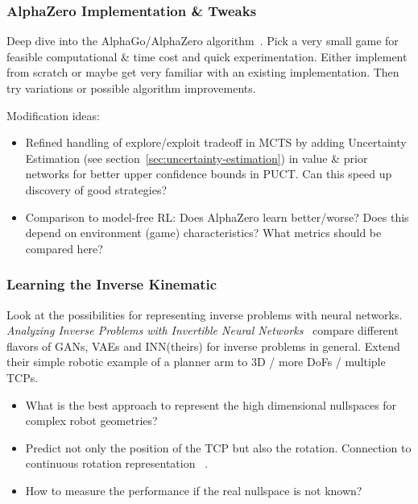 \documentclass[a4paper]{article}
\begin{document}
\subsubsection{AlphaZero Implementation \& Tweaks}
Deep dive into the AlphaGo/AlphaZero algorithm~\cite{Silver2016, Silver2017, Silver2017a}. Pick a very small game for feasible computational \& time cost and quick experimentation. Either implement from scratch or maybe get very familiar with an existing implementation. Then try variations or possible algorithm improvements.

Modification ideas:
\begin{itemize}
  \item Refined handling of explore/exploit tradeoff in MCTS by adding Uncertainty Estimation (see section~\ref{sec:uncertainty-estimation}) in value \& prior networks for better upper confidence bounds in PUCT. Can this speed up discovery of good strategies?
  \item Comparison to model-free RL: Does AlphaZero learn better/worse? Does this depend on environment (game) characteristics? What metrics should be compared here?
\end{itemize}

\subsubsection{Learning the Inverse Kinematic}
Look at the possibilities for representing inverse problems with neural networks.
\textit{Analyzing Inverse Problems with Invertible Neural Networks}~\cite{Ardizzone2018}
compare different flavors of GANs, VAEs and INN(theirs) for inverse problems in general. Extend their simple robotic example of a planner arm to 3D / more DoFs / multiple TCPs.
\begin{itemize}
  \item What is the best approach to represent the high dimensional nullspaces for complex robot geometries?
  \item Predict not only the position of the TCP but also the rotation. Connection to continuous rotation representation ~\cite{Zhou2018}.
  \item How to measure the performance if the real nullspace is not known?
\end{itemize}
\end{document}
